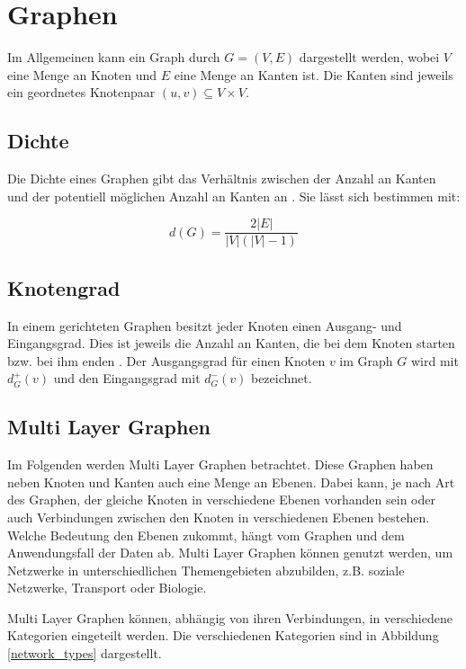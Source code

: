 \section{Graphen}


Im Allgemeinen kann ein Graph durch $G = (V, E)$ dargestellt werden, wobei $V$ eine Menge an Knoten und $E$ eine Menge an Kanten ist. Die Kanten sind jeweils ein geordnetes Knotenpaar $(u, v) \subseteq V \times V$.

\subsection{Dichte}
\label{dichte}

Die Dichte eines Graphen gibt das Verhältnis zwischen der Anzahl an Kanten und der potentiell möglichen Anzahl an Kanten an \cite{diestel2010graphentheorie}.
Sie lässt sich bestimmen mit:

\[ d(G) =  \frac{2|{E}|}{|V|(|V| - 1)}    \]


\subsection{Knotengrad}
\label{knotengrad}

In einem gerichteten Graphen besitzt jeder Knoten einen Ausgang- und Eingangsgrad. Dies ist jeweils die Anzahl an Kanten, die bei dem Knoten starten bzw. bei ihm enden \cite{diestel2010graphentheorie}.
Der Ausgangsgrad für einen Knoten $v$ im Graph $G$ wird mit $d^{+}_{G}(v)$ und den Eingangsgrad mit $d^{-}_{G}(v)$ bezeichnet.


\subsection{Multi Layer Graphen}

Im Folgenden werden Multi Layer Graphen betrachtet. Diese Graphen haben neben Knoten und Kanten auch eine Menge an Ebenen. Dabei kann, je nach Art des Graphen, der gleiche Knoten in verschiedene Ebenen vorhanden sein oder auch Verbindungen zwischen den Knoten in verschiedenen Ebenen bestehen.
Welche Bedeutung den Ebenen zukommt, hängt vom Graphen und dem Anwendungsfall der Daten ab. Multi Layer Graphen können genutzt werden, um Netzwerke in unterschiedlichen Themengebieten abzubilden, z.B. soziale Netzwerke, Transport oder Biologie.

Multi Layer Graphen können, abhängig von ihren Verbindungen, in verschiedene Kategorien eingeteilt werden. Die verschiedenen Kategorien sind in Abbildung \ref{network_types} dargestellt. 

